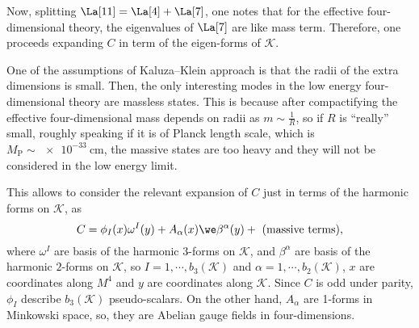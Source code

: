 Now, splitting $\La[11] = \La[4] + \La[7]$, one notes that for the effective four-dimensional theory, the eigenvalues of $\La[7]$ are like  mass term. Therefore, one proceeds  expanding $C$ in term of the eigen-forms of $\mathcal{K}$.

One of the  assumptions of Kaluza--Klein approach is that %
the radii of the extra dimensions is small. Then, the only interesting modes in the low energy four-dimensional theory are  massless states. This is because after compactifying the effective four-dimensional mass depends on radii as $m \sim \frac{1}{R}$, so if $R$ is ``really'' small, roughly speaking if it is of Planck length scale, which is $M_{\text{P}} \sim \SI{e-33}{\cm}$, the massive states are too heavy and they will not be considered in the low energy limit.

This allows  to consider the relevant expansion of $C$ just in terms of the harmonic forms on $\mathcal{K}$, as 
\begin{equation}
  C = \phi_I(x) \omega^I(y) + A_\alpha(x) \we \beta^\alpha(y) + \text{ (massive terms)},
\end{equation}
where $\omega^I$ are basis of the harmonic $3$-forms on $\mathcal{K}$, and $\beta^\alpha$ are basis of the harmonic $2$-forms on $\mathcal{K}$, so $I = 1, \cdots, b_3(\mathcal{K})$ and $\alpha = 1, \cdots, b_2(\mathcal{K})$, $x$ are coordinates along $M^4$ and $y$ are coordinates along $\mathcal{K}$. Since $C$ is odd under parity, $\phi_I$ describe $b_3(\mathcal{K})$ pseudo-scalars. On the other hand, $A_\alpha$ are  1-forms in Minkowski space, so, they are Abelian gauge fields in four-dimensions.
